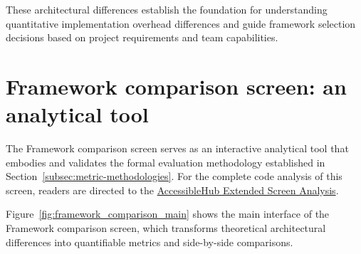 \FloatBarrier

These architectural differences establish the foundation for understanding quantitative implementation overhead differences and guide framework selection decisions based on project requirements and team capabilities.

\section{Framework comparison screen: an analytical tool}
\label{sec:framework-comparison}

The Framework comparison screen serves as an interactive analytical tool that embodies and validates the formal evaluation methodology established in Section~\ref{subsec:metric-methodologies}. 
For the complete code analysis of this screen, readers are directed to the \href{https://github.com/gabrielrovesti/AccessibleHub/blob/main/Technical\%20Thesis\%20Appendix/AccessibleHub\%20-\%20Extended\%20screen\%20analysis.pdf}{AccessibleHub Extended Screen Analysis}. 

Figure~\ref{fig:framework_comparison_main} shows the main interface of the Framework comparison screen, which transforms theoretical architectural differences into quantifiable metrics and side-by-side comparisons.


